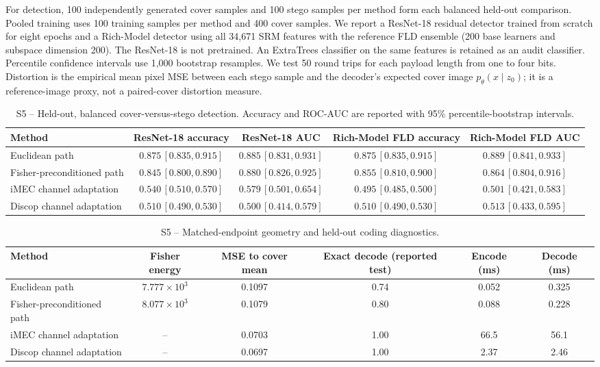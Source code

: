 \documentclass[a4paper,fleqn]{cas-dc}
\begin{document}
For detection, 100 independently generated cover samples and 100 stego samples
per method form each balanced held-out comparison. Pooled training uses 100
training samples per method and 400 cover samples. We report a ResNet-18
residual detector trained from scratch for eight epochs and a Rich-Model
detector using all 34,671 SRM features with the reference FLD ensemble (200
base learners and subspace dimension 200). The ResNet-18 is not pretrained.
An ExtraTrees classifier on the same features is retained as an audit
classifier. Percentile confidence intervals use 1,000 bootstrap resamples. We
test 50 round trips for each payload length from one to four bits. Distortion is the empirical mean
pixel MSE between each stego sample and the decoder's expected cover image
$p_{\theta}(x\mid z_0)$; it is a reference-image proxy, not a paired-cover
distortion measure.

\begin{table}[ht]
  \centering
  \caption{S5 -- Held-out, balanced cover-versus-stego detection. Accuracy and
    ROC-AUC are reported with 95\% percentile-bootstrap intervals.}
  \label{tab:s5}
  \small
  \begin{tabular}{lcccc}
    \toprule
    Method & ResNet-18 accuracy & ResNet-18 AUC & Rich-Model FLD accuracy & Rich-Model FLD AUC \\
    \midrule
    Euclidean path & $0.875\,[0.835,0.915]$ & $0.885\,[0.831,0.931]$ & $0.875\,[0.835,0.915]$ & $0.889\,[0.841,0.933]$ \\
    Fisher-preconditioned path & $0.845\,[0.800,0.890]$ & $0.880\,[0.826,0.925]$ & $0.855\,[0.810,0.900]$ & $0.864\,[0.804,0.916]$ \\
    iMEC channel adaptation & $0.540\,[0.510,0.570]$ & $0.579\,[0.501,0.654]$ & $0.495\,[0.485,0.500]$ & $0.501\,[0.421,0.583]$ \\
    Discop channel adaptation & $0.510\,[0.490,0.530]$ & $0.500\,[0.414,0.579]$ & $0.510\,[0.490,0.530]$ & $0.513\,[0.433,0.595]$ \\
    \bottomrule
  \end{tabular}
\end{table}

\begin{table}[ht]
  \centering
  \caption{S5 -- Matched-endpoint geometry and held-out coding diagnostics.}
  \label{tab:s5coding}
  \small
  \begin{tabular}{lccccc}
    \toprule
    Method & Fisher energy & MSE to cover mean & Exact decode (reported test) & Encode (ms) & Decode (ms) \\
    \midrule
    Euclidean path & $7.777\times10^3$ & 0.1097 & 0.74 & 0.052 & 0.325 \\
    Fisher-preconditioned path & $8.077\times10^3$ & 0.1079 & 0.80 & 0.088 & 0.228 \\
    iMEC channel adaptation & -- & 0.0703 & 1.00 & 66.5 & 56.1 \\
    Discop channel adaptation & -- & 0.0697 & 1.00 & 2.37 & 2.46 \\
    \bottomrule
  \end{tabular}
\end{table}
\end{document}
